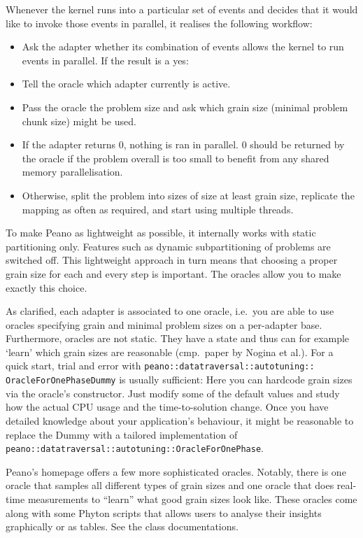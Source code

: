 Whenever the kernel runs into a particular set of events and decides that it
would like to invoke those events in parallel, it realises the following
workflow:
\begin{itemize}
  \item Ask the adapter whether its combination of events allows the kernel to
  run events in parallel. If the result is a yes:
  \item Tell the oracle which adapter currently is active.
  \item Pass the oracle the problem size and ask which grain size (minimal
  problem chunk size) might be used. 
  \item If the adapter returns 0, nothing is ran in parallel. 0 should be
  returned by the oracle if the problem overall is too small to benefit from any
  shared memory parallelisation.
  \item Otherwise, split the problem into sizes of size at least grain size,
  replicate the mapping as often as required, and start using multiple threads.
\end{itemize}

\begin{remark}
 To make Peano as lightweight as possible, it internally works with static
 partitioning only. Features such as dynamic subpartitioning of problems are
 switched off. This lightweight approach in turn means that choosing a proper
 grain size for each and every step  is important. The oracles allow you to make
 exactly this choice.
\end{remark}


\noindent
As clarified, each adapter is associated to one oracle, i.e.~you are able to
use oracles specifying grain and minimal problem sizes on a per-adapter base.
Furthermore, oracles are not static.
They have a state and thus can for example `learn' which grain sizes are
reasonable (cmp.~paper by Nogina et al.).
For a quick start, trial and error with
\texttt{peano::datatraversal::autotuning::}
\texttt{OracleForOnePhaseDummy} is usually sufficient: 
Here you can hardcode grain sizes via the oracle's constructor.
Just modify some of the default values and study how the actual CPU usage
and the time-to-solution change.
Once you have detailed knowledge about your application's behaviour, it might
be reasonable to replace the Dummy with a tailored implementation of
\texttt{peano::datatraversal::autotuning::OracleForOnePhase}.


Peano's homepage offers a few more sophisticated oracles. 
Notably, there is one oracle that samples all different types of grain sizes and
one oracle that does real-time measurements to ``learn'' what good grain sizes
look like. 
These oracles come along with some Phyton scripts that allows users to analyse
their insights graphically or as tables.
See the class documentations.


